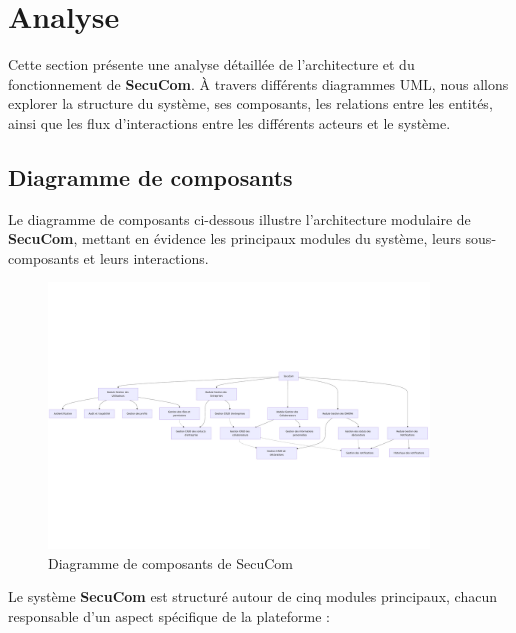\chapter{Analyse}

\noindent Cette section présente une analyse détaillée de l'architecture et du fonctionnement de \textbf{SecuCom}. À travers différents diagrammes UML, nous allons explorer la structure du système, ses composants, les relations entre les entités, ainsi que les flux d'interactions entre les différents acteurs et le système.

\section{Diagramme de composants}

\noindent Le diagramme de composants ci-dessous illustre l'architecture modulaire de \textbf{SecuCom}, mettant en évidence les principaux modules du système, leurs sous-composants et leurs interactions.

\begin{figure}[H]
\centering
\includegraphics[width=0.9\textwidth]{ComposantsDiagram.png}
\caption{Diagramme de composants de SecuCom}
\end{figure}

\vspace{0.5cm}

\noindent Le système \textbf{SecuCom} est structuré autour de cinq modules principaux, chacun responsable d'un aspect spécifique de la plateforme :

